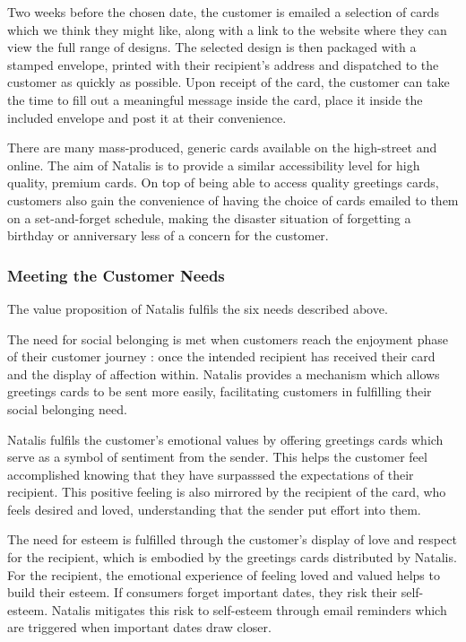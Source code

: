 \documentclass[10pt,a4paper]{article}
\begin{document}
Two weeks before the chosen date, the customer is emailed a selection of cards which we think they might like, along with a link to the website where they can view the full range of designs. The selected design is then packaged with a stamped envelope, printed with their recipient's address and dispatched to the customer as quickly as possible. Upon receipt of the card, the customer can take the time to fill out a meaningful message inside the card, place it inside the included envelope and post it at their convenience.

There are many mass-produced, generic cards available on the high-street and online. The aim of Natalis is to provide a similar accessibility level for high quality, premium cards. On top of being able to access quality greetings cards, customers also gain the convenience of having the choice of cards emailed to them on a set-and-forget schedule, making the disaster situation of forgetting a birthday or anniversary less of a concern for the customer.

\subsubsection*{Meeting the Customer Needs}
The value proposition of Natalis fulfils the six needs described above.

The need for social belonging is met when customers reach the enjoyment phase of their customer journey \citep{edelman2015competing}: once the intended recipient has received their card and the display of affection within. Natalis provides a mechanism which allows greetings cards to be sent more easily, facilitating customers in fulfilling their social belonging need.


Natalis fulfils the customer's emotional values by offering greetings cards which serve as a symbol of sentiment from the sender. This helps the customer feel accomplished knowing that they have surpasssed the expectations of their recipient. This positive feeling is also mirrored by the recipient of the card, who feels desired and loved, understanding that the sender put effort into them.

The need for esteem is fulfilled through the customer's display of love and respect for the recipient, which is embodied by the greetings cards distributed by Natalis. For the recipient, the emotional experience of feeling loved and valued helps to build their esteem. If consumers forget important dates, they risk their self-esteem. Natalis mitigates this risk to self-esteem through email reminders which are triggered when important dates draw closer.
\end{document}
